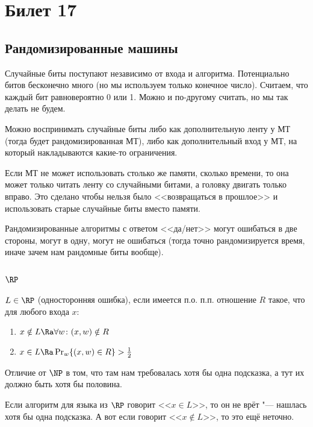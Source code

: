 \setcounter{section}{16}
\section{Билет 17}
\subsection{Рандомизированные машины}
	Случайные биты поступают независимо от входа и алгоритма.
	Потенциально битов бесконечно много (но мы используем только конечное число).
	Считаем, что каждый бит равновероятно 0 или 1.
	Можно и по-другому считать, но мы так делать не будем.

	Можно воспринимать случайные биты либо как дополнительную ленту у МТ
	(тогда будет рандомизированная МТ), либо как дополнительный вход у МТ, на который накладываются какие-то ограничения.
	\begin{Rem}
		Если МТ не может использовать столько же памяти, сколько времени, то она может только читать ленту со случайными битами,
		а головку двигать только вправо.
		Это сделано чтобы нельзя было <<возвращаться в прошлое>> и использовать старые случайные биты вместо памяти.
	\end{Rem}

	Рандомизированные алгоритмы с ответом <<да/нет>> могут ошибаться в две стороны, могут в одну,
	могут не ошибаться (тогда точно рандомизируется время, иначе зачем нам рандомные биты вообще).

\subsection[RP]{$\RP$}
	\begin{Def}
		$L \in \RP$ (односторонняя ошибка), если имеется п.о. п.п. отношение $R$ такое, что для любого входа $x$:
		\begin{enumerate}
			\item $x \notin L \Ra \forall w \colon (x, w) \notin R$
			\item $x \in L \Ra \Pr_w \{ (x, w) \in R \} > \frac 12$
		\end{enumerate}
	\end{Def}
	\begin{Rem}
		Отличие от $\NP$ в том, что там нам требовалась хотя бы одна подсказка, а тут их должно быть хотя бы половина.
	\end{Rem}
	\begin{Rem}
		Если алгоритм для языка из $\RP$ говорит <<$x \in L$>>, то он не врёт "--- нашлась хотя бы одна подсказка.
		А вот если говорит <<$x \notin L$>>, то это ещё неточно.
	\end{Rem}


